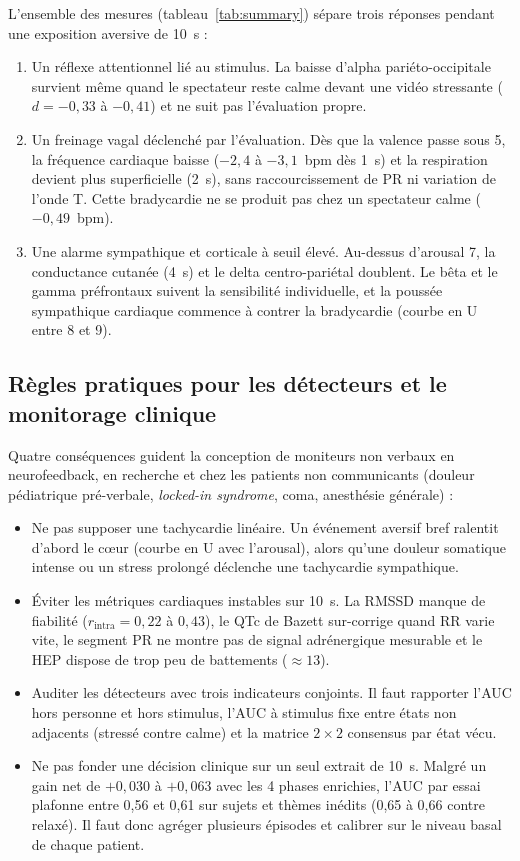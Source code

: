\documentclass[10pt]{article}
\begin{document}
L'ensemble des mesures (tableau~\ref{tab:summary}) sépare trois réponses pendant une exposition aversive de 10~s :
\begin{enumerate}
\item Un réflexe attentionnel lié au stimulus. La baisse d'alpha pariéto-occipitale survient même quand le spectateur reste calme devant une vidéo stressante ($d = -0{,}33$ à $-0{,}41$) et ne suit pas l'évaluation propre.
\item Un freinage vagal déclenché par l'évaluation. Dès que la valence passe sous 5, la fréquence cardiaque baisse ($-2{,}4$ à $-3{,}1$~bpm dès 1~s) et la respiration devient plus superficielle (2~s), sans raccourcissement de PR ni variation de l'onde T. Cette bradycardie ne se produit pas chez un spectateur calme ($-0{,}49$~bpm).
\item Une alarme sympathique et corticale à seuil élevé. Au-dessus d'arousal 7, la conductance cutanée (4~s) et le delta centro-pariétal doublent. Le bêta et le gamma préfrontaux suivent la sensibilité individuelle, et la poussée sympathique cardiaque commence à contrer la bradycardie (courbe en U entre 8 et 9).
\end{enumerate}

\subsection{Règles pratiques pour les détecteurs et le monitorage clinique}

Quatre conséquences guident la conception de moniteurs non verbaux en neurofeedback, en recherche et chez les patients non communicants (douleur pédiatrique pré-verbale, \emph{locked-in syndrome}, coma, anesthésie générale) :
\begin{itemize}
\item Ne pas supposer une tachycardie linéaire. Un événement aversif bref ralentit d'abord le cœur (courbe en U avec l'arousal), alors qu'une douleur somatique intense ou un stress prolongé déclenche une tachycardie sympathique.
\item Éviter les métriques cardiaques instables sur 10~s. La RMSSD manque de fiabilité ($r_{\text{intra}} = 0{,}22$ à $0{,}43$), le QTc de Bazett sur-corrige quand RR varie vite, le segment PR ne montre pas de signal adrénergique mesurable et le HEP dispose de trop peu de battements ($\approx 13$).
\item Auditer les détecteurs avec trois indicateurs conjoints. Il faut rapporter l'AUC hors personne et hors stimulus, l'AUC à stimulus fixe entre états non adjacents (stressé contre calme) et la matrice $2 \times 2$ consensus par état vécu.
\item Ne pas fonder une décision clinique sur un seul extrait de 10~s. Malgré un gain net de $+0{,}030$ à $+0{,}063$ avec les 4 phases enrichies, l'AUC par essai plafonne entre 0,56 et 0,61 sur sujets et thèmes inédits (0,65 à 0,66 contre relaxé). Il faut donc agréger plusieurs épisodes et calibrer sur le niveau basal de chaque patient.
\end{itemize}
\end{document}
